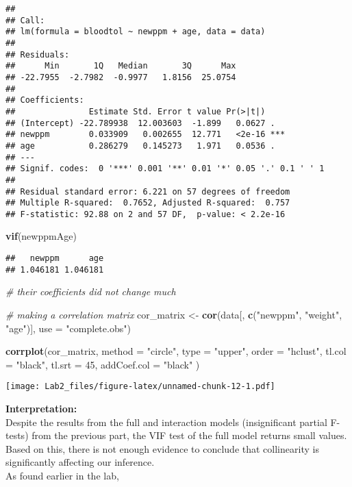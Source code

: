 \documentclass[
]{article}
\newenvironment{Shaded}{\begin{snugshade}}{\end{snugshade}}
\newcommand{\AttributeTok}[1]{\textcolor[rgb]{0.13,0.29,0.53}{#1}}
\newcommand{\CommentTok}[1]{\textcolor[rgb]{0.56,0.35,0.01}{\textit{#1}}}
\newcommand{\DecValTok}[1]{\textcolor[rgb]{0.00,0.00,0.81}{#1}}
\newcommand{\FunctionTok}[1]{\textcolor[rgb]{0.13,0.29,0.53}{\textbf{#1}}}
\newcommand{\NormalTok}[1]{#1}
\newcommand{\OtherTok}[1]{\textcolor[rgb]{0.56,0.35,0.01}{#1}}
\newcommand{\StringTok}[1]{\textcolor[rgb]{0.31,0.60,0.02}{#1}}
\begin{document}
\begin{verbatim}
## 
## Call:
## lm(formula = bloodtol ~ newppm + age, data = data)
## 
## Residuals:
##      Min       1Q   Median       3Q      Max 
## -22.7955  -2.7982  -0.9977   1.8156  25.0754 
## 
## Coefficients:
##               Estimate Std. Error t value Pr(>|t|)    
## (Intercept) -22.789938  12.003603  -1.899   0.0627 .  
## newppm        0.033909   0.002655  12.771   <2e-16 ***
## age           0.286279   0.145273   1.971   0.0536 .  
## ---
## Signif. codes:  0 '***' 0.001 '**' 0.01 '*' 0.05 '.' 0.1 ' ' 1
## 
## Residual standard error: 6.221 on 57 degrees of freedom
## Multiple R-squared:  0.7652, Adjusted R-squared:  0.757 
## F-statistic: 92.88 on 2 and 57 DF,  p-value: < 2.2e-16
\end{verbatim}

\begin{Shaded}
\begin{Highlighting}[]
\FunctionTok{vif}\NormalTok{(newppmAge)}
\end{Highlighting}
\end{Shaded}

\begin{verbatim}
##   newppm      age 
## 1.046181 1.046181
\end{verbatim}

\begin{Shaded}
\begin{Highlighting}[]
\CommentTok{\# their coefficients did not change much}

\CommentTok{\# making a correlation matrix}
\NormalTok{cor\_matrix }\OtherTok{\textless{}{-}} \FunctionTok{cor}\NormalTok{(data[, }\FunctionTok{c}\NormalTok{(}\StringTok{"newppm"}\NormalTok{, }\StringTok{"weight"}\NormalTok{, }\StringTok{"age"}\NormalTok{)], }\AttributeTok{use =} \StringTok{"complete.obs"}\NormalTok{)}

\FunctionTok{corrplot}\NormalTok{(cor\_matrix,}
  \AttributeTok{method =} \StringTok{"circle"}\NormalTok{, }\AttributeTok{type =} \StringTok{"upper"}\NormalTok{, }\AttributeTok{order =} \StringTok{"hclust"}\NormalTok{,}
  \AttributeTok{tl.col =} \StringTok{"black"}\NormalTok{, }\AttributeTok{tl.srt =} \DecValTok{45}\NormalTok{, }\AttributeTok{addCoef.col =} \StringTok{"black"}
\NormalTok{)}
\end{Highlighting}
\end{Shaded}

\texttt{[image: Lab2\_files/figure-latex/unnamed-chunk-12-1.pdf]}

\textbf{Interpretation:}\\
Despite the results from the full and interaction models (insignificant
partial F-tests) from the previous part, the VIF test of the full model
returns small values. Based on this, there is not enough evidence to
conclude that collinearity is significantly affecting our inference.\\
As found earlier in the lab,
\end{document}
